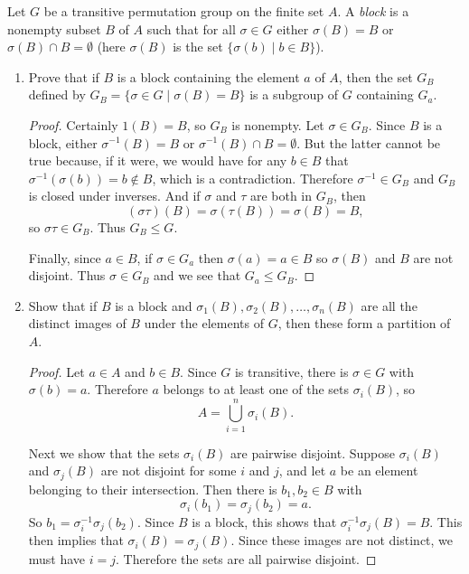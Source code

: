  Let $G$ be a transitive permutation group on the finite set
$A$. A {\em block} is a nonempty subset $B$ of $A$ such that for all
$\sigma\in G$ either $\sigma(B) = B$ or $\sigma(B)\cap B = \emptyset$
(here $\sigma(B)$ is the set $\{\sigma(b)\mid b\in B\}$).
\begin{enumerate}
\item Prove that if $B$ is a block containing the element $a$ of $A$,
  then the set $G_B$ defined by
  $G_B = \{\sigma\in G\mid \sigma(B) = B\}$ is a subgroup of $G$
  containing $G_a$.
  \begin{proof}
    Certainly $1(B) = B$, so $G_B$ is nonempty. Let $\sigma\in
    G_B$. Since $B$ is a block, either $\sigma^{-1}(B) = B$ or
    $\sigma^{-1}(B)\cap B = \emptyset$. But the latter cannot be true
    because, if it were, we would have for any $b\in B$ that
    $\sigma^{-1}(\sigma(b)) = b\not\in B$, which is a
    contradiction. Therefore $\sigma^{-1}\in G_B$ and $G_B$ is closed
    under inverses. And if $\sigma$ and $\tau$ are both in $G_B$, then
    \begin{equation*}
      (\sigma\tau)(B) = \sigma(\tau(B)) = \sigma(B) = B,
    \end{equation*}
    so $\sigma\tau\in G_B$. Thus $G_B\leq G$.

    Finally, since $a\in B$, if $\sigma\in G_a$ then
    $\sigma(a) = a\in B$ so $\sigma(B)$ and $B$ are not disjoint. Thus
    $\sigma\in G_B$ and we see that $G_a\leq G_B$.
  \end{proof}

\item Show that if $B$ is a block and
  $\sigma_1(B), \sigma_2(B), \dots, \sigma_n(B)$ are all the distinct
  images of $B$ under the elements of $G$, then these form a partition
  of $A$.
  \begin{proof}
    Let $a\in A$ and $b\in B$. Since $G$ is transitive, there is
    $\sigma\in G$ with $\sigma(b) = a$. Therefore $a$ belongs to at
    least one of the sets $\sigma_i(B)$, so
    \begin{equation*}
      A = \bigcup_{i=1}^n\sigma_i(B).
    \end{equation*}

    Next we show that the sets $\sigma_i(B)$ are pairwise
    disjoint. Suppose $\sigma_i(B)$ and $\sigma_j(B)$ are not disjoint
    for some $i$ and $j$, and let $a$ be an element belonging to their
    intersection. Then there is $b_1,b_2\in B$ with
    \begin{equation*}
      \sigma_i(b_1) = \sigma_j(b_2) = a.
    \end{equation*}
    So $b_1 = \sigma_i^{-1}\sigma_j(b_2)$. Since $B$ is a block, this
    shows that $\sigma_i^{-1}\sigma_j(B) = B$. This then implies that
    $\sigma_i(B) = \sigma_j(B)$. Since these images are not distinct,
    we must have $i = j$. Therefore the sets are all pairwise
    disjoint.


\end{proof}
\end{enumerate}
